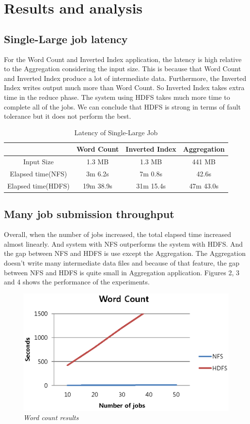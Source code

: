 \documentclass[nocopyrightspace]{sigplanconf}
\begin{document}
\section*{Results and analysis}
\subsection*{Single-Large job latency}
For the Word Count and Inverted Index application, the latency is high relative to 
the Aggregation considering the input size. This is because that Word Count and Inverted 
Index produce a lot of intermediate data. Furthermore, the Inverted Index writes output 
much more than Word Count. So Inverted Index takes extra time in the reduce phase.
 The system using HDFS takes much more time to complete all of the jobs. We can conclude that HDFS 
is strong in terms of fault tolerance but it does not perform the best.

\begin{table}[h!]
   \small
   \centering
   \begin{tabular}{| c | c | c | c |}
       \hline
       & Word Count & Inverted Index & Aggregation \\
       \hline
       Input Size & 1.3 MB & 1.3 MB & 441 MB \\
       \hline
       Elapsed time(NFS) & 3m 6.2s & 7m 0.8s & 42.6s \\
       \hline
       Elapsed time(HDFS) & 19m 38.9s & 31m 15.4s & 47m 43.0s \\
       \hline
   \end{tabular}
   \caption{Latency of Single-Large Job}
   \label{table:latency}
\end{table}

\subsection*{Many job submission throughput}
Overall, when the number of jobs increased, the total elapsed time increased almost linearly. 
And system with NFS outperforms the system with HDFS. And the gap between NFS and HDFS is use except 
the Aggregation. The Aggregation doesn’t write many intermediate data files and because of that feature, 
the gap between NFS and HDFS is quite small in Aggregation application. Figures 2, 3 and 4 shows the
performance of the experiments.

\begin{figure}
\centering \includegraphics[width=.50\textwidth]{word_count.eps}
\caption{\textit{Word count results}}
\label{fig:fig2}
\end{figure}
\end{document}
